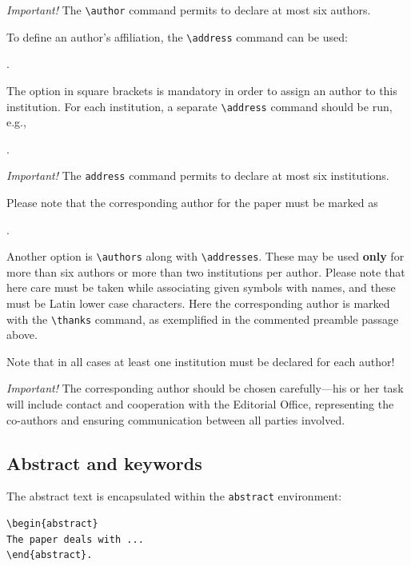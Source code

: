 \documentclass{amcs}
\begin{document}
\medskip\noindent
\emph{Important!} The \verb+\author+ command permits to declare at most six authors.

To define an author's affiliation, the \verb+\address+ command can be used:

\medskip
{}.

\medskip\noindent
The option in square brackets is mandatory in order to assign an author to this institution. For each institution, a separate \verb+\address+ command should be run, e.g.,

\medskip
{}
.

\medskip\noindent
\emph{Important!} The \verb+address+ command permits to declare at most six institutions.

Please note that the corresponding author for the paper must be marked as

\medskip
{}.

\medskip\noindent
Another option is \verb+\authors+ along with  \verb+\addresses+. These may be used \textbf{only} for more than six authors or more than two institutions per author. Please note that here care must be taken while associating given symbols with names, and these must be Latin lower case characters. Here the corresponding author is marked with the \verb+\thanks+ command, as exemplified in the commented preamble passage above.

Note that in all cases at least one institution must be declared for each author!

\medskip\noindent
\emph{Important!} The corresponding author should be chosen carefully---his or her task will include contact and cooperation with the Editorial Office, representing the co-authors and ensuring communication between all parties involved.

\subsection{Abstract and keywords}
The abstract text is encapsulated within the \verb+abstract+ environment:

{\small \begin{verbatim}
\begin{abstract}
The paper deals with ...
\end{abstract}.
\end{verbatim}}
\end{document}
